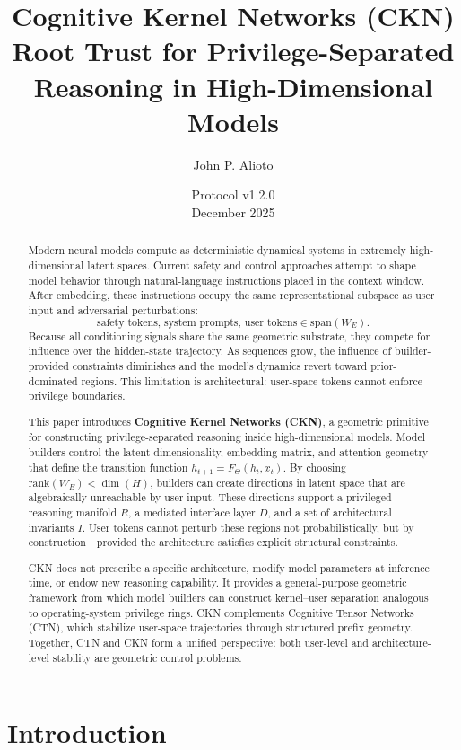 \documentclass[11pt,a4paper]{article}
\title{Cognitive Kernel Networks (CKN)\\[0.5em]
\large Root Trust for Privilege-Separated Reasoning in High-Dimensional Models}
\author{John P. Alioto}
\date{Protocol v1.2.0\\December 2025}
\begin{document}
\maketitle

\begin{abstract}
Modern neural models compute as deterministic dynamical systems in extremely high-dimensional latent spaces. Current safety and control approaches attempt to shape model behavior through natural-language instructions placed in the context window. After embedding, these instructions occupy the same representational subspace as user input and adversarial perturbations:
\[
\text{safety tokens, system prompts, user tokens} \in \text{span}(W_E).
\]
Because all conditioning signals share the same geometric substrate, they compete for influence over the hidden-state trajectory. As sequences grow, the influence of builder-provided constraints diminishes and the model's dynamics revert toward prior-dominated regions. This limitation is architectural: user-space tokens cannot enforce privilege boundaries.

This paper introduces \textbf{Cognitive Kernel Networks (CKN)}, a geometric primitive for constructing privilege-separated reasoning inside high-dimensional models. Model builders control the latent dimensionality, embedding matrix, and attention geometry that define the transition function $h_{t+1} = F_\Theta(h_t, x_t)$. By choosing $\text{rank}(W_E) < \dim(H)$, builders can create directions in latent space that are algebraically unreachable by user input. These directions support a privileged reasoning manifold $R$, a mediated interface layer $D$, and a set of architectural invariants $I$. User tokens cannot perturb these regions not probabilistically, but by construction---provided the architecture satisfies explicit structural constraints.

CKN does not prescribe a specific architecture, modify model parameters at inference time, or endow new reasoning capability. It provides a general-purpose geometric framework from which model builders can construct kernel--user separation analogous to operating-system privilege rings. CKN complements Cognitive Tensor Networks (CTN), which stabilize user-space trajectories through structured prefix geometry. Together, CTN and CKN form a unified perspective: both user-level and architecture-level stability are geometric control problems.
\end{abstract}

\section{Introduction}
\end{document}
